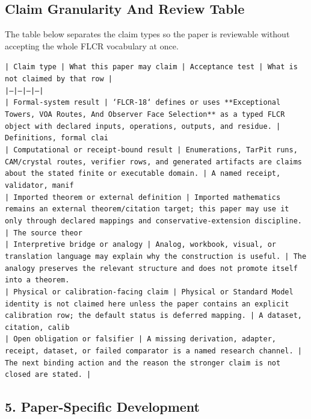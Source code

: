 \documentclass[11pt]{article}
\begin{document}
\subsection*{Claim Granularity And Review Table}

The table below separates the claim types so the paper is reviewable without accepting the whole FLCR vocabulary at once.

\noindent\texttt{| Claim type | What this paper may claim | Acceptance test | What is not claimed by that row |}\\
\noindent\texttt{|---|---|---|---|}\\
\noindent\texttt{| Formal-system result | `FLCR-18` defines or uses **Exceptional Towers, VOA Routes, And Observer Face Selection** as a typed FLCR object with declared inputs, operations, outputs, and residue. | Definitions, formal clai}\\
\noindent\texttt{| Computational or receipt-bound result | Enumerations, TarPit runs, CAM/crystal routes, verifier rows, and generated artifacts are claims about the stated finite or executable domain. | A named receipt, validator, manif}\\
\noindent\texttt{| Imported theorem or external definition | Imported mathematics remains an external theorem/citation target; this paper may use it only through declared mappings and conservative-extension discipline. | The source theor}\\
\noindent\texttt{| Interpretive bridge or analogy | Analog, workbook, visual, or translation language may explain why the construction is useful. | The analogy preserves the relevant structure and does not promote itself into a theorem. }\\
\noindent\texttt{| Physical or calibration-facing claim | Physical or Standard Model identity is not claimed here unless the paper contains an explicit calibration row; the default status is deferred mapping. | A dataset, citation, calib}\\
\noindent\texttt{| Open obligation or falsifier | A missing derivation, adapter, receipt, dataset, or failed comparator is a named research channel. | The next binding action and the reason the stronger claim is not closed are stated. | }\\

\subsection*{5. Paper-Specific Development}
\end{document}
